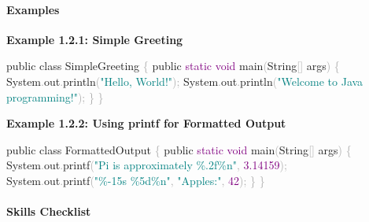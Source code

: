 \documentclass[
  justified,
  openright,
]{tufte-book}
\let\subsubsection\paragraph
\let\paragraph\paragraph
\newcommand{\BuiltInTok}[1]{#1}
\newcommand{\DataTypeTok}[1]{\textcolor{Purple}{#1}}
\newcommand{\DecValTok}[1]{\textcolor{Purple}{#1}}
\newcommand{\FloatTok}[1]{\textcolor{Purple}{#1}}
\newcommand{\FunctionTok}[1]{\textcolor{BrandBlue}{#1}}
\newcommand{\KeywordTok}[1]{\textcolor{BrandBlue}{#1}}
\newcommand{\NormalTok}[1]{#1}
\newcommand{\OperatorTok}[1]{\textcolor{DarkGray}{#1}}
\newcommand{\SpecialCharTok}[1]{\textcolor{Teal}{#1}}
\newcommand{\StringTok}[1]{\textcolor{Teal}{#1}}
\newenvironment{Shaded}{%
  \begin{snugshade}
}{%
  \end{snugshade}
}
\let\subsubsection\paragraph
\let\paragraph\paragraph
\begin{document}
\subsubsection{Examples}\label{examples}

\textbf{Example 1.2.1: Simple Greeting}

\begin{Shaded}
\begin{Highlighting}[]
\KeywordTok{public} \KeywordTok{class}\NormalTok{ SimpleGreeting }\OperatorTok{\{}
    \KeywordTok{public} \DataTypeTok{static} \DataTypeTok{void} \FunctionTok{main}\OperatorTok{(}\BuiltInTok{String}\OperatorTok{[]}\NormalTok{ args}\OperatorTok{)} \OperatorTok{\{}
        \BuiltInTok{System}\OperatorTok{.}\FunctionTok{out}\OperatorTok{.}\FunctionTok{println}\OperatorTok{(}\StringTok{"Hello, World!"}\OperatorTok{);}
        \BuiltInTok{System}\OperatorTok{.}\FunctionTok{out}\OperatorTok{.}\FunctionTok{println}\OperatorTok{(}\StringTok{"Welcome to Java programming!"}\OperatorTok{);}
    \OperatorTok{\}}
\OperatorTok{\}}
\end{Highlighting}
\end{Shaded}

\textbf{Example 1.2.2: Using printf for Formatted Output}

\begin{Shaded}
\begin{Highlighting}[]
\KeywordTok{public} \KeywordTok{class}\NormalTok{ FormattedOutput }\OperatorTok{\{}
    \KeywordTok{public} \DataTypeTok{static} \DataTypeTok{void} \FunctionTok{main}\OperatorTok{(}\BuiltInTok{String}\OperatorTok{[]}\NormalTok{ args}\OperatorTok{)} \OperatorTok{\{}
        \BuiltInTok{System}\OperatorTok{.}\FunctionTok{out}\OperatorTok{.}\FunctionTok{printf}\OperatorTok{(}\StringTok{"Pi is approximately }\SpecialCharTok{\%.2f\%n}\StringTok{"}\OperatorTok{,} \FloatTok{3.14159}\OperatorTok{);}
        \BuiltInTok{System}\OperatorTok{.}\FunctionTok{out}\OperatorTok{.}\FunctionTok{printf}\OperatorTok{(}\StringTok{"}\SpecialCharTok{\%{-}15s}\StringTok{ }\SpecialCharTok{\%5d\%n}\StringTok{"}\OperatorTok{,} \StringTok{"Apples:"}\OperatorTok{,} \DecValTok{42}\OperatorTok{);}
    \OperatorTok{\}}
\OperatorTok{\}}
\end{Highlighting}
\end{Shaded}

\subsubsection{Skills Checklist}\label{skills-checklist-3}
\end{document}
